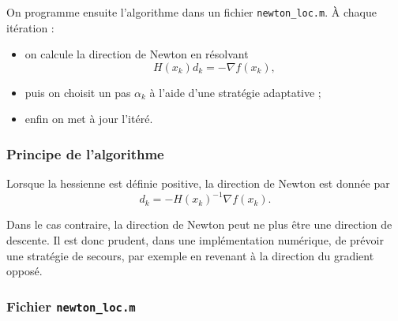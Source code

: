 \documentclass[a4paper,12pt]{article}
\begin{document}
	On programme ensuite l’algorithme dans un fichier \texttt{newton\_loc.m}. À chaque itération :
	\begin{itemize}
		\item on calcule la direction de Newton en résolvant
		\[
		H(x_k)d_k=-\nabla f(x_k),
		\]
		\item puis on choisit un pas \(\alpha_k\) à l’aide d’une stratégie adaptative ;
		\item enfin on met à jour l’itéré.
	\end{itemize}
	
	\subsubsection{Principe de l’algorithme}
	
	Lorsque la hessienne est définie positive, la direction de Newton est donnée par
	\[
	d_k=-H(x_k)^{-1}\nabla f(x_k).
	\]
	
	Dans le cas contraire, la direction de Newton peut ne plus être une direction de descente. Il est donc prudent, dans une implémentation numérique, de prévoir une stratégie de secours, par exemple en revenant à la direction du gradient opposé.
	
	\subsubsection{Fichier \texttt{newton\_loc.m}}
	
\end{document}
